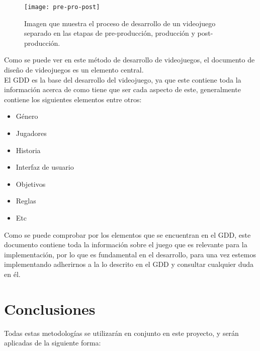 \begin{figure}[h]
  \centering
  \texttt{[image: pre-pro-post]}
  \caption{Imagen que muestra el proceso de desarrollo de un videojuego separado en las etapas de pre-producción, producción y post-producción.\protect\footnotemark}
  \label{figura-pre-pro-post}
\end{figure}


\newpage

Como se puede ver en este método de desarrollo de videojuegos, el documento de diseño de videojuegos es un elemento central.\\

El GDD es la base del desarrollo del videojuego, ya que este contiene toda la información acerca de como tiene que ser cada aspecto de este, generalmente contiene los siguientes elementos entre otros:

\begin{itemize}
  \item Género
  \item Jugadores
  \item Historia
  \item Interfaz de usuario
  \item Objetivos
  \item Reglas
  \item Etc
\end{itemize}

Como se puede comprobar por los elementos que se encuentran en el GDD, este documento contiene toda la información sobre el juego que es relevante para la implementación, por lo que es fundamental en el desarrollo, para una vez estemos implementando adherirnos a la lo descrito en el GDD y consultar cualquier duda en él.

\section{Conclusiones}
Todas estas metodologías se utilizarán en conjunto en este proyecto, y serán aplicadas de la siguiente forma:

